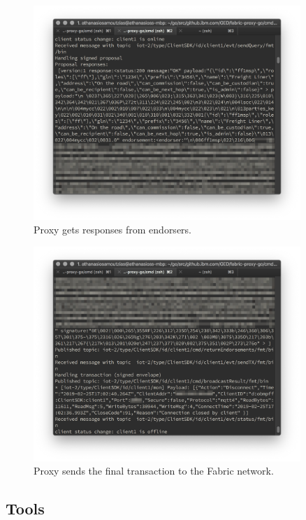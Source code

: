 \begin{figure}[H]
    \centering
    \includegraphics[width=0.9\textwidth]{images/6_performance/proxy-mid.png}
    \caption{Proxy gets responses from endorsers.}
    \label{fig:proxy-mid}
\end{figure}

\begin{figure}[H]
    \centering
    \includegraphics[width=0.9\textwidth]{images/6_performance/proxy-final.png}
    \caption{Proxy sends the final transaction to the Fabric network.}
    \label{fig:proxy-final}
\end{figure}

\subsection{Tools}
